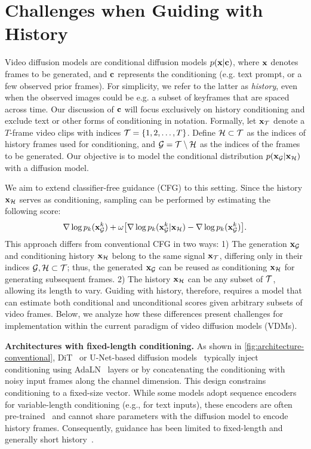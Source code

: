 \section{Challenges when Guiding with History}
\label{sec:history_guidance_challenges}

 


Video diffusion models are conditional diffusion models  $p({\mathbf{x}}|{\mathbf{c}})$, where ${\mathbf{x}}$ denotes frames to be generated, and ${\mathbf{c}}$ represents the conditioning (e.g. text prompt, or a few observed prior frames). For simplicity, we refer to the latter as \emph{history}, even when the observed images could be e.g. a subset of keyframes that are spaced across time. Our discussion of ${\mathbf{c}}$ will focus exclusively on history conditioning and exclude text or other forms of conditioning in notation. Formally, let ${\mathbf{x}}_{{\mathcal{T}}}$ denote a $T$-frame video clips with indices ${\mathcal{T}} = \{1, 2, \ldots, T\}$. Define ${\mathcal{H}} \subset {\mathcal{T}}$ as the indices of history frames used for conditioning, and ${\mathcal{G}} = {\mathcal{T}} \setminus {\mathcal{H}}$ as the indices of the frames to be generated. Our objective is to model the conditional distribution $p({\mathbf{x}_{\mathcal{G}}} | {\mathbf{x}_{\mathcal{H}}})$ with a diffusion model. 

We aim to extend classifier-free guidance (CFG) to this setting. Since the history ${\mathbf{x}_{\mathcal{H}}}$ serves as conditioning, sampling can be performed by estimating the following score: 
\begin{equation} 
\label{eq:history_guidance}
{\nabla \log\,} p_k({\mathbf{x}_{\mathcal{G}}^{k}})
+ \omega \big[{\nabla \log\,} p_k({\mathbf{x}_{\mathcal{G}}^{k}}|{\mathbf{x}_{\mathcal{H}}})  - {\nabla \log\,} p_k({\mathbf{x}_{\mathcal{G}}^{k}})\big].
\end{equation}
This approach differs from conventional CFG in two ways: 1) The generation ${\mathbf{x}_{\mathcal{G}}}$ and conditioning history ${\mathbf{x}_{\mathcal{H}}}$ belong to the same signal ${\mathbf{x}}_{{\mathcal{T}}}$, differing only in their indices ${\mathcal{G}}, {\mathcal{H}}\subset {\mathcal{T}}$; thus, the generated ${\mathbf{x}_{\mathcal{G}}}$ can be reused as conditioning ${\mathbf{x}_{\mathcal{H}}}$ for generating subsequent frames. 2) The history ${\mathbf{x}_{\mathcal{H}}}$ can be any subset of ${\mathcal{T}}$, allowing its length to vary. Guiding with history, therefore, requires a model that can estimate both conditional and unconditional scores given arbitrary subsets of video frames. Below, we analyze how these differences present challenges for implementation within the current paradigm of video diffusion models (VDMs).

\textbf{Architectures with fixed-length conditioning.}
As shown in \cref{fig:architecture-conventional}, DiT~\cite{peebles2023scalable} or U-Net-based diffusion models~\cite{bao2023all,rombach2022high} typically inject conditioning using AdaLN~\cite{peebles2023scalable, perez2018film} layers or by concatenating the conditioning with noisy input frames along the channel dimension.
This design constrains conditioning to a fixed-size vector. While some models adopt sequence encoders for variable-length conditioning (e.g., for text inputs), these encoders are often pre-trained~\cite{yang2024cogvideox} and cannot share parameters with the diffusion model to encode history frames. %
Consequently, guidance has been limited to fixed-length and generally short history~\cite{blattmann2023stable, xing2023dynamicrafter, yang2024cogvideox, watson2024controlling}.

